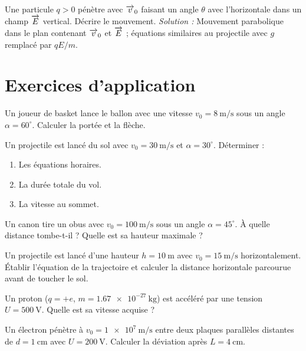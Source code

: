 \begin{exemple}
Une particule $q>0$ pénètre avec $\overrightarrow{v}_0$ faisant un angle $\theta$ avec l’horizontale dans un champ $\overrightarrow{E}$ vertical. Décrire le mouvement.
\emph{Solution :} Mouvement parabolique dans le plan contenant $\overrightarrow{v}_0$ et $\overrightarrow{E}$ ; équations similaires au projectile avec $g$ remplacé par $qE/m$.
\end{exemple}

\section{Exercices d’application}


\exo{} Un joueur de basket lance le ballon avec une vitesse $v_0=\SI{8}{\metre\per\second}$ sous un angle $\alpha=60^\circ$. Calculer la portée et la flèche.

\exo{} Un projectile est lancé du sol avec $v_0=\SI{30}{\metre\per\second}$ et $\alpha=30^\circ$. Déterminer :
\begin{enumerate}
\item Les équations horaires.
\item La durée totale du vol.
\item La vitesse au sommet.
\end{enumerate}

\exo{} Un canon tire un obus avec $v_0=\SI{100}{\metre\per\second}$ sous un angle $\alpha=45^\circ$. À quelle distance tombe-t-il ? Quelle est sa hauteur maximale ?

\exo{} Un projectile est lancé d’une hauteur $h=\SI{10}{\metre}$ avec $v_0=\SI{15}{\metre\per\second}$ horizontalement. Établir l’équation de la trajectoire et calculer la distance horizontale parcourue avant de toucher le sol.


\exo{} Un proton ($q=+e$, $m=\SI{1.67e-27}{\kilogram}$) est accéléré par une tension $U=\SI{500}{\volt}$. Quelle est sa vitesse acquise ?

\exo{} Un électron pénètre à $v_0=\SI{1e7}{\metre\per\second}$ entre deux plaques parallèles distantes de $d=\SI{1}{\centi\metre}$ avec $U=\SI{200}{\volt}$. Calculer la déviation après $L=\SI{4}{\centi\metre}$.


